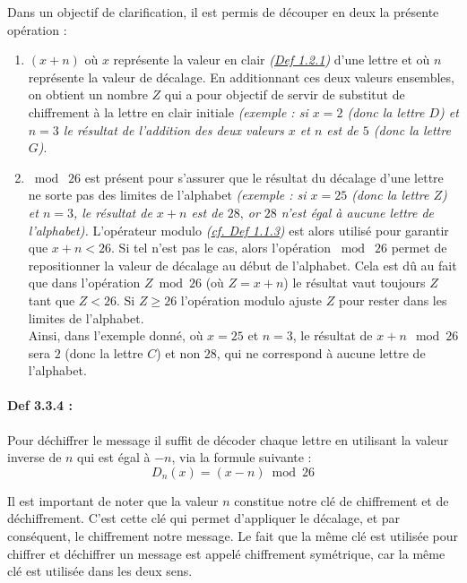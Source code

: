 \documentclass{article}
\begin{document}
Dans un objectif de clarification, il est permis de découper en deux
la présente opération :

\begin{enumerate}
	\def\labelenumi{\arabic{enumi}.}
	\item
	\((x+n)\) où \(x\) représente la valeur en clair
	\textit{(\hyperref[def-1.2.1]{Def 1.2.1})} d'une lettre et où \(n\) représente
	la valeur de décalage. En additionnant ces deux valeurs ensembles, on
	obtient un nombre \(Z\) qui a pour objectif de servir de substitut de chiffrement
	à la lettre en clair initiale \textit{(exemple : si \(x = 2\) (donc la
		lettre \(D\)) et \(n=3\) le résultat de l'addition des deux valeurs
		\(x\) et \(n\) est de \(5\) (donc la lettre \(G\))}.
	\item
	\(\bmod \;26\) est présent pour s'assurer que le résultat du décalage
	d'une lettre ne sorte pas des limites de l'alphabet \textit{(exemple :
		si \(x=25\) (donc la lettre \(Z\)) et \(n=3\), le résultat de \(x+n\)
		est de \(28\text{,}\) or \(28\) n'est égal à aucune lettre de
		l'alphabet).} L'opérateur modulo \textit{(\hyperref[def-1.1.4]{cf. Def
			1.1.3})} est alors utilisé pour garantir que
	\(x+n < 26\). Si tel n'est pas le cas, alors l'opération
	\(\bmod \; 26\) permet de repositionner la valeur de décalage au début de l'alphabet. 
	Cela est dû au fait que dans l'opération
	\(Z \bmod 26\) (où \(Z=x+n\)) le résultat vaut toujours \(Z\) tant que \(Z < 26\). Si \(Z\geq26\) l'opération modulo ajuste \(Z\) pour rester dans les limites de l'alphabet. \\
	
	Ainsi, dans l'exemple donné, où
	\(x=25\) et \(n=3\), le résultat de \(x+n \mod 26\) sera \(2\)
	(donc la lettre \(C\)) et non \(28\), qui ne correspond à aucune
	lettre de l'alphabet.
\end{enumerate}

\paragraph{Def 3.3.4 :}\label{def-3.3.4}

Pour déchiffrer le message il suffit de décoder chaque lettre en
utilisant la valeur inverse de \(n\) qui est égal à \(-n\), via la
formule suivante : \[
D_n(x)=(x-n) \bmod 26
\]

Il est important de noter que la valeur \(n\) constitue notre clé de
chiffrement et de déchiffrement. C'est cette clé qui permet d'appliquer
le décalage, et par conséquent, le chiffrement notre message. Le fait
que la même clé est utilisée pour chiffrer et déchiffrer un message est
appelé chiffrement symétrique, car la même clé est utilisée dans les
deux sens. \\
\end{document}
